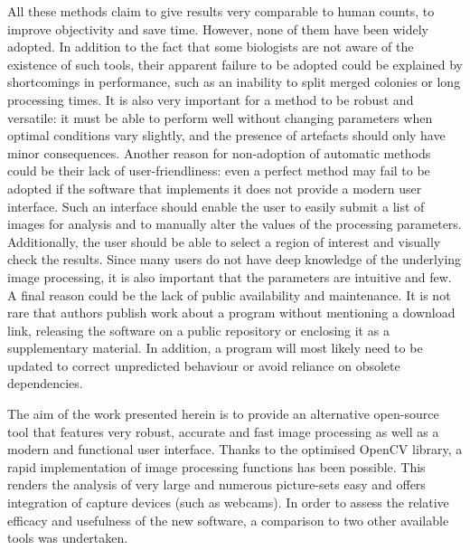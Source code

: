 \documentclass[10pt]{article}
\begin{document}
All these methods claim to give results very comparable to human counts, to improve
objectivity and save time. However, none of them have been widely adopted.
In addition to the fact that some biologists are not aware of the existence of such
tools, their apparent failure to be adopted could be explained by shortcomings
in performance, such as an inability to split merged colonies
or long processing times. It is also very important for a method to be robust and versatile:
it must be able to perform well without changing parameters when optimal conditions vary slightly,
and the presence of artefacts should only have minor consequences.
Another reason for non-adoption of automatic methods could be their lack of
user-friendliness: even a perfect method may fail to be adopted if the software
that implements it does not provide a modern user interface. Such an interface
should enable the user to easily submit a list of images for analysis and to
manually alter the values of the processing parameters. Additionally, the user
should be able to select a region of interest and visually check the results.
Since many users do not have deep knowledge of the underlying image processing, 
it is also important that the parameters are intuitive and few.
A final reason could be the lack of public availability
and maintenance. It is not rare that authors publish work about a
program without mentioning a download link, releasing the software on a public
repository or enclosing it as a supplementary
material\cite{bewes_automated_2008,kachouie_arraycount_2009}.
In addition, a program will most likely need to be updated to correct
unpredicted behaviour or avoid reliance on obsolete dependencies.

The aim of the work presented herein is to provide an alternative open-source tool that
features very robust, accurate and fast image processing as well as a modern and
functional user interface. Thanks to the optimised OpenCV
library\cite{opencv_library}, a rapid implementation of image processing
functions has been possible. This renders the analysis of very large and
numerous picture-sets easy and offers integration of capture devices 
(such as webcams). 
In order to assess the relative efficacy and usefulness of the new software,
a comparison to two other available tools was undertaken.

\end{document}
